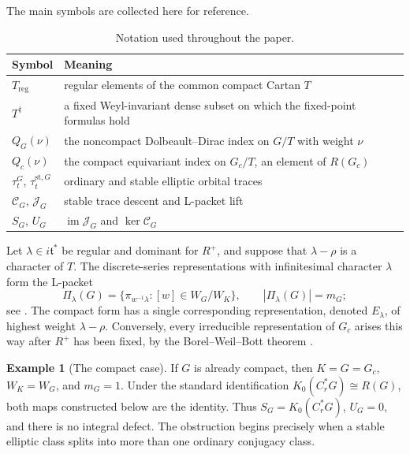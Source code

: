 \documentclass[11pt]{amsart}
\theoremstyle{definition}
\newtheorem{example}[theorem]{Example}
\theoremstyle{remark}
\begin{document}
The main symbols are collected here for reference.
\begin{table}[H]
\centering
\small
\renewcommand{\arraystretch}{1.15}
\caption{Notation used throughout the paper.}
\label{tab:notation}
\begin{tabular}{@{}p{}p{}@{}}
\toprule
Symbol & Meaning\\
\midrule
\(T_{\mathrm{reg}}\) & regular elements of the common compact Cartan \(T\)\\
\(T^\dagger\) & a fixed Weyl-invariant dense subset on which the fixed-point formulas hold\\
\(Q_G(\nu)\) & the noncompact Dolbeault--Dirac index on \(G/T\) with weight \(\nu\)\\
\(Q_c(\nu)\) & the compact equivariant index on \(G_c/T\), an element of \(R(G_c)\)\\
\(\tau_t^G\), \(\tau_t^{\mathrm{st},G}\) & ordinary and stable elliptic orbital traces\\
\(\mathcal C_G\), \(\mathcal J_G\) & stable trace descent and L-packet lift\\
\(S_G\), \(U_G\) & \(\operatorname{im}\mathcal J_G\) and \(\ker\mathcal C_G\)\\
\bottomrule
\end{tabular}
\end{table}

Let $\lambda\in i\mathfrak t^*$ be regular and dominant for $R^+$, and suppose that $\lambda-\rho$ is a character of $T$.  The discrete-series representations with infinitesimal character $\lambda$ form the L-packet
\begin{equation}\label{eq:packet-cosets}
  \Pi_\lambda(G)
  =\{\pi_{w^{-1}\lambda}:[w]\in W_G/W_K\},
  \qquad
  |\Pi_\lambda(G)|=m_G;
\end{equation}
see \cite[Proposition~2.7]{HochsWang2018Shelstad}.  The compact form has a single corresponding representation, denoted $E_\lambda$, of highest weight $\lambda-\rho$.  Conversely, every irreducible representation of $G_c$ arises this way after $R^+$ has been fixed, by the Borel--Weil--Bott theorem \cite{Bott1957}.

\begin{example}[The compact case]\label{ex:compact-case}
If \(G\) is already compact, then \(K=G=G_c\), \(W_K=W_G\), and
\(m_G=1\).  Under the standard identification
\(K_0(C_r^*G)\cong R(G)\), both maps constructed below are the identity.
Thus \(S_G=K_0(C_r^*G)\), \(U_G=0\), and there is no integral defect.  The
obstruction begins precisely when a stable elliptic class splits into more than
one ordinary conjugacy class.
\end{example}
\end{document}
